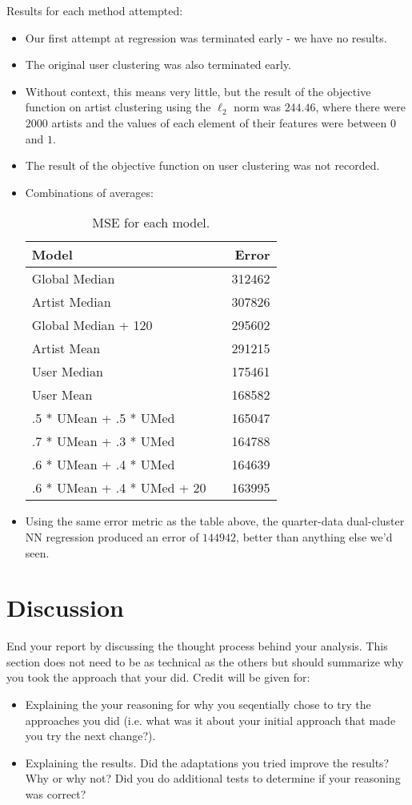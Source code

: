 \documentclass[11pt]{article}
\begin{document}
\noindent Results for each method attempted: 
\begin{itemize}
	\item Our first attempt at regression was terminated early - we have no results.
	\item The original user clustering was also terminated early.
	\item Without context, this means very little, but the result of the objective function on artist clustering using the $\ell_2$ norm was $244.46$, where there were $2000$ artists and the values of each element of their features were between $0$ and $1$.
	\item The result of the objective function on user clustering was not recorded.
	\item Combinations of averages:
	\begin{table}[h]
		\centering
		\begin{tabular}{llr}
			\toprule
			Model &  & Error \\
			\midrule
			Global Median & & 312462 \\
			Artist Median & & 307826 \\
			Global Median + 120 & & 295602 \\
			Artist Mean & & 291215\\
			User Median & & 175461  \\
			User Mean & &168582 \\
			.5 * UMean + .5 * UMed & & 165047 \\
			.7 * UMean + .3 * UMed & & 164788 \\
			.6 * UMean + .4 * UMed & & 164639 \\
			.6 * UMean + .4 * UMed + 20 & & 163995 \\
			\bottomrule
		\end{tabular}
		\caption{\label{tab:results} MSE for each model.}
	\end{table}

	\item Using the same error metric as the table above, the quarter-data dual-cluster NN regression produced an error of $144942$, better than anything else we'd seen.
\end{itemize}


\section{Discussion} 


End your report by discussing the thought process behind your
analysis. This section does not need to be as technical as the others 
but should summarize why you took the approach that your did. Credit will be given for:

  \begin{itemize}
  \item Explaining the your reasoning for why you seqentially chose to
    try the approaches you did (i.e. what was it about your initial
    approach that made you try the next change?).  
  \item Explaining the results.  Did the adaptations you tried improve
    the results?  Why or why not?  Did you do additional tests to
    determine if your reasoning was correct?  
  \end{itemize}
 
\end{document}
